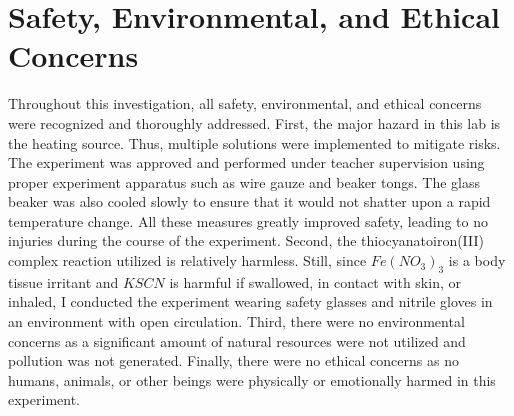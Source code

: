 \section{Safety, Environmental, and Ethical Concerns}
Throughout this investigation, all safety, environmental, and ethical concerns were recognized and thoroughly addressed. First, the major hazard in this lab is the heating source. Thus, multiple solutions were implemented to mitigate risks. The experiment was approved and performed under teacher supervision using proper experiment apparatus such as wire gauze and beaker tongs. The glass beaker was also cooled slowly to ensure that it would not shatter upon a rapid temperature change. All these measures greatly improved safety, leading to no injuries during the course of the experiment. Second, the thiocyanatoiron(III) complex reaction utilized is relatively harmless. Still, since \(Fe(NO_3)_3\) is a body tissue irritant and \(KSCN\) is harmful if swallowed, in contact with skin, or inhaled, I conducted the experiment wearing safety glasses and nitrile gloves in an environment with open circulation. Third, there were no environmental concerns as a significant amount of natural resources were not utilized and pollution was not generated. Finally, there were no ethical concerns as no humans, animals, or other beings were physically or emotionally harmed in this experiment.